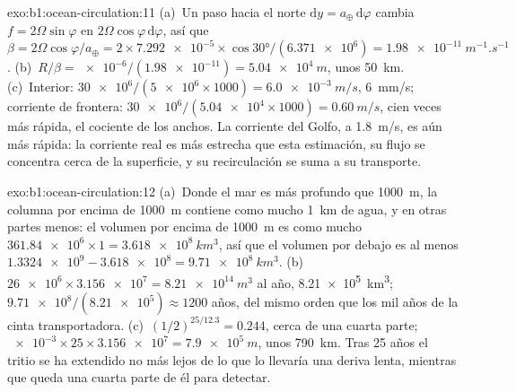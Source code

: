 \begin{solution}{exo:b1:ocean-circulation:11}
(a)~Un paso hacia el norte $\mathrm dy = a_\oplus\,\mathrm d\varphi$ cambia $f = 2\Omega
\sin\varphi$ en $2\Omega\cos\varphi\,\mathrm d\varphi$, así que $\beta = 2\Omega
\cos\varphi/a_\oplus = 2 \times \num{7.292e-5} \times \cos\ang{30}/(\num{6.371e6}) =
\qty{1.98e-11}{m^{-1}.s^{-1}}$. (b)~$R/\beta = \num{e-6}/(\num{1.98e-11}) =
\qty{5.04e4}{m}$, unos \qty{50}{km}. (c)~Interior: $\num{30e6}/(\num{5e6} \times
1000) = \qty{6.0e-3}{m/s}$, \qty{6}{mm/s}; corriente de frontera: $\num{30e6}/(\num{5.04e4}
\times 1000) = \qty{0.60}{m/s}$, cien veces más rápida, el cociente de los anchos. La corriente del Golfo, a \qty{1.8}{m/s}, es aún más rápida: la corriente real es más estrecha que esta estimación, su flujo se concentra cerca de la superficie, y su recirculación se suma a su transporte.
\end{solution}

\begin{solution}{exo:b1:ocean-circulation:12}
(a)~Donde el mar es más profundo que \qty{1000}{m}, la columna por encima de \qty{1000}{m} contiene como mucho \qty{1}{km} de agua, y en otras partes menos: el volumen por encima de \qty{1000}{m} es como mucho $\num{361.84e6} \times 1 = \qty{3.618e8}{km^3}$, así que el volumen por debajo es al menos $\num{1.3324e9} - \num{3.618e8} = \qty{9.71e8}{km^3}$.
(b)~$\num{26e6} \times \num{3.156e7} = \qty{8.21e14}{m^3}$ al año,
\qty{8.21e5}{km^3}; $\num{9.71e8}/(\num{8.21e5}) \approx 1200$ años, del mismo orden que los mil años de la cinta transportadora. (c)~$(1/2)^{25/12.3} = 0.244$, cerca de una cuarta parte;
$\num{e-3} \times 25 \times \num{3.156e7} = \qty{7.9e5}{m}$, unos \qty{790}{km}. Tras 25 años el tritio se ha extendido no más lejos de lo que lo llevaría una deriva lenta, mientras que queda una cuarta parte de él para detectar.
\end{solution}

